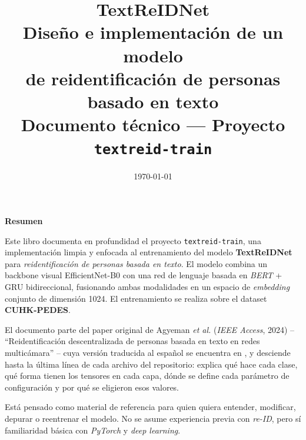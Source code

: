 \documentclass[11pt,a4paper,openany,twoside=false]{book}
\title{\Huge\textbf{TextReIDNet}\\[0.3cm]
\Large Diseño e implementación de un modelo\\[0.2cm]
de reidentificación de personas\\[0.2cm]
basado en texto\\[1cm]
\normalfont\large Documento técnico — Proyecto \texttt{textreid-train}}
\author{}
\date{\today}
\newcommand{\file}[1]{\texttt{\detokenize{#1}}}
\newcommand{\gru}{GRU}
\newcommand{\eff}{EfficientNet-B0}
\begin{document}
\frontmatter
\maketitle

\begin{center}
\textbf{\large Resumen}
\end{center}

\noindent
Este libro documenta en profundidad el proyecto \texttt{textreid-train}, una
implementación limpia y enfocada al entrenamiento del modelo \textbf{TextReIDNet}
para \emph{reidentificación de personas basada en texto}. El modelo combina
un backbone visual \eff{} con una red de lenguaje basada en \emph{BERT} +
\gru{} bidireccional, fusionando ambas modalidades en un espacio de
\emph{embedding} conjunto de dimensión 1024. El entrenamiento se realiza
sobre el dataset \textbf{CUHK-PEDES}.

El documento parte del paper original de Agyeman \emph{et al.} (\emph{IEEE
Access}, 2024) -- ``Reidentificación descentralizada de personas basada
en texto en redes multicámara'' -- cuya versión traducida al español se
encuentra en \file{docs/paper.md}, y desciende hasta la última línea de
cada archivo del repositorio: explica qué hace cada clase, qué forma
tienen los tensores en cada capa, dónde se define cada parámetro de
configuración y por qué se eligieron esos valores.

Está pensado como material de referencia para quien quiera entender,
modificar, depurar o reentrenar el modelo. No se asume experiencia
previa con \emph{re-ID}, pero sí familiaridad básica con \emph{PyTorch}
y \emph{deep learning}.

\vspace{1cm}

\tableofcontents
\listoffigures
\listoftables
\listoflistings

\mainmatter
















\backmatter


\end{document}
